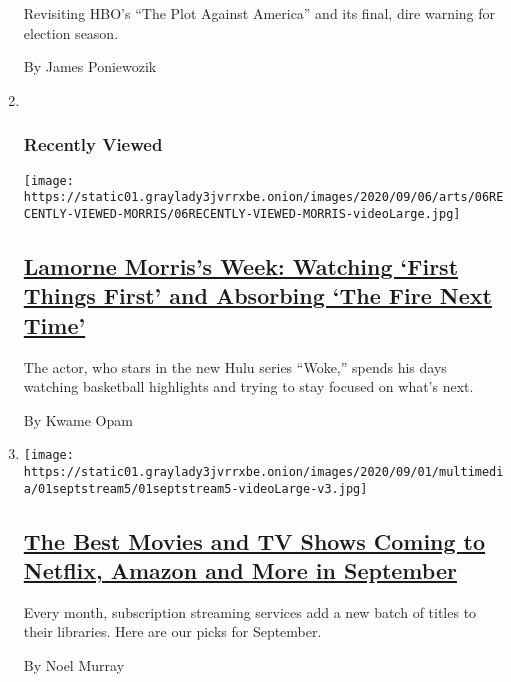 \begin{enumerate}
  Revisiting HBO's ``The Plot Against America'' and its final, dire
  warning for election season.

  By James Poniewozik
\item ~
  \hypertarget{recently-viewed}{%
  \subsubsection{Recently Viewed}\label{recently-viewed}}

  \texttt{[image: https://static01.graylady3jvrrxbe.onion/images/2020/09/06/arts/06RECENTLY-VIEWED-MORRIS/06RECENTLY-VIEWED-MORRIS-videoLarge.jpg]}

  \hypertarget{lamorne-morriss-week-watching-first-things-first-and-absorbing-the-fire-next-time}{%
  \subsection{\texorpdfstring{\href{/2020/09/02/arts/television/lamorne-morris-favorites.html}{Lamorne
  Morris's Week: Watching `First Things First' and Absorbing `The Fire
  Next
  Time'}}{Lamorne Morris's Week: Watching `First Things First' and Absorbing `The Fire Next Time'}}\label{lamorne-morriss-week-watching-first-things-first-and-absorbing-the-fire-next-time}}

  The actor, who stars in the new Hulu series ``Woke,'' spends his days
  watching basketball highlights and trying to stay focused on what's
  next.

  By Kwame Opam
\item
  \texttt{[image: https://static01.graylady3jvrrxbe.onion/images/2020/09/01/multimedia/01septstream5/01septstream5-videoLarge-v3.jpg]}

  \hypertarget{the-best-movies-and-tv-shows-coming-to-netflix-amazon-and-more-in-september}{%
  \subsection{\texorpdfstring{\href{/article/new-on-netflix-shows-movies.html}{The
  Best Movies and TV Shows Coming to Netflix, Amazon and More in
  September}}{The Best Movies and TV Shows Coming to Netflix, Amazon and More in September}}\label{the-best-movies-and-tv-shows-coming-to-netflix-amazon-and-more-in-september}}

  Every month, subscription streaming services add a new batch of titles
  to their libraries. Here are our picks for September.

  By Noel Murray
\end{enumerate}

